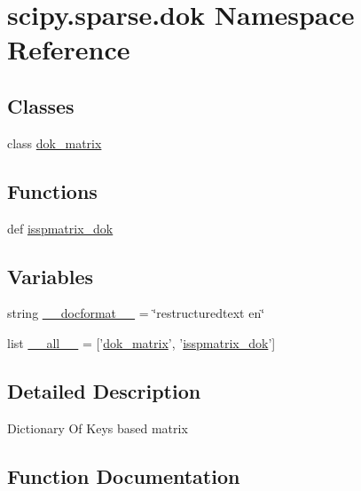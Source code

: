 \hypertarget{namespacescipy_1_1sparse_1_1dok}{}\section{scipy.\+sparse.\+dok Namespace Reference}
\label{namespacescipy_1_1sparse_1_1dok}
\subsection*{Classes}
\begin{DoxyCompactItemize}
\item 
class \hyperlink{classscipy_1_1sparse_1_1dok_1_1dok__matrix}{dok\+\_\+matrix}
\end{DoxyCompactItemize}
\subsection*{Functions}
\begin{DoxyCompactItemize}
\item 
def \hyperlink{namespacescipy_1_1sparse_1_1dok_a2a9a87e2b796f47c132ea614938be29a}{isspmatrix\+\_\+dok}
\end{DoxyCompactItemize}
\subsection*{Variables}
\begin{DoxyCompactItemize}
\item 
string \hyperlink{namespacescipy_1_1sparse_1_1dok_aa45dd8bd8e817696acef22abb7682556}{\+\_\+\+\_\+docformat\+\_\+\+\_\+} = \char`\"{}restructuredtext en\char`\"{}
\item 
list \hyperlink{namespacescipy_1_1sparse_1_1dok_ae55456faef7772cda52ec9c88368a5cb}{\+\_\+\+\_\+all\+\_\+\+\_\+} = \mbox{[}'\hyperlink{classscipy_1_1sparse_1_1dok_1_1dok__matrix}{dok\+\_\+matrix}', '\hyperlink{namespacescipy_1_1sparse_1_1dok_a2a9a87e2b796f47c132ea614938be29a}{isspmatrix\+\_\+dok}'\mbox{]}
\end{DoxyCompactItemize}


\subsection{Detailed Description}
\begin{DoxyVerb}Dictionary Of Keys based matrix\end{DoxyVerb}
 

\subsection{Function Documentation}
\hypertarget{namespacescipy_1_1sparse_1_1dok_a2a9a87e2b796f47c132ea614938be29a}{}

